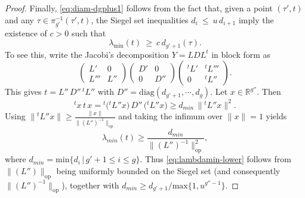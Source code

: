 \documentclass[10pt,a4paper]{amsart}
\newcommand{\R}{\mathbb R}
\begin{document}
\begin{proof}
Finally, \eqref{eq:diam-dgplus1} follows from the fact that, given a point $(\tau',t)$ and any $\tau\in \pi^{-1}_{g'}(\tau',t)$, the Siegel set inequalities $d_{i}~\leq~ u \,d_{i+1}$ imply the existence of $c>0$ such that
\begin{equation}\label{eq:lambdamin-lower}
    \lambda_{\min}(t)\ \ge\ c\, d_{g'+1}(\tau).
\end{equation}
To see this, write the Jacobi's decomposition $Y=LDL^t$ in block form as
\begin{equation}
       \begin{pmatrix}
            L'&0\\
            L'''&L''
        \end{pmatrix}
        \begin{pmatrix}
            D'&0\\
            0&D''
        \end{pmatrix}
        \begin{pmatrix}
            ^tL'&^tL'''\\
            0&^tL''
        \end{pmatrix}.
\end{equation}
This gives $t=L''\,D''\,{}^tL''$ with $D''=\mathrm{diag}(d_{g'+1},\cdots,d_{g})$. Let $x \in \R^{g''}$. Then
\[
{}^tx\, t\, x = {}^t\bigl({}^tL'' x\bigr)\,D''\,\bigl({}^tL'' x\bigr) \ge d_{min}\,\|{}^tL'' x\|^2.
\]
Using $\|{}^tL'' x\|\ge \frac{\|x\|}{\|(L'')^{-1}\|_{\mathrm{op}}}$ and taking the infimum over $\|x\|=1$ yields
\[
\lambda_{min}(t) \ge \frac{d_{min}}{\|(L'')^{-1}\|_{\mathrm{op}}^2},
\]
where $d_{min}=\mathrm{min}\{d_i\,|\, g'+1\leq i \leq g \}$. Thus \eqref{eq:lambdamin-lower} follows from $\|(L'')\|_{\mathrm{op}}$ being uniformly bounded on the Siegel set (and consequently $\|(L'')^{-1}\|_{\mathrm{op}}$), together with $d_{min} \geq d_{g'+1}/\mathrm{max}\{1,u^{g''-1}\}$.
\end{proof}
\end{document}
